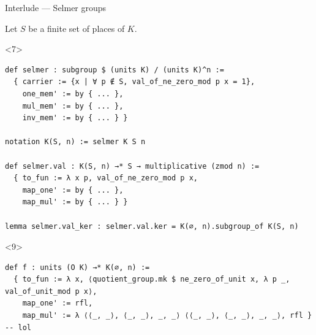 \documentclass[10pt]{beamer}
\begin{document}
\begin{frame}[fragile, t]{Interlude --- Selmer groups}

Let $ S $ be a finite set of places of $ K $.


\begin{onlyenv}<7>
\begin{lstlisting}[basicstyle=\scriptsize, frame=single]
def selmer : subgroup $ (units K) / (units K)^n :=
  { carrier := {x | ∀ p ∉ S, val_of_ne_zero_mod p x = 1},
    one_mem' := by { ... },
    mul_mem' := by { ... },
    inv_mem' := by { ... } }

notation K(S, n) := selmer K S n

def selmer.val : K(S, n) →* S → multiplicative (zmod n) :=
  { to_fun := λ x p, val_of_ne_zero_mod p x,
    map_one' := by { ... },
    map_mul' := by { ... } }

lemma selmer.val_ker : selmer.val.ker = K(∅, n).subgroup_of K(S, n)
\end{lstlisting}
\end{onlyenv}


\begin{onlyenv}<9>
\begin{lstlisting}[basicstyle=\scriptsize, frame=single]
def f : units (O K) →* K(∅, n) :=
  { to_fun := λ x, ⟨quotient_group.mk $ ne_zero_of_unit x, λ p _, val_of_unit_mod p x⟩,
    map_one' := rfl,
    map_mul' := λ ⟨⟨_, _⟩, ⟨_, _⟩, _, _⟩ ⟨⟨_, _⟩, ⟨_, _⟩, _, _⟩, rfl } -- lol


\end{lstlisting}
\end{onlyenv}
\end{frame}
\end{document}
